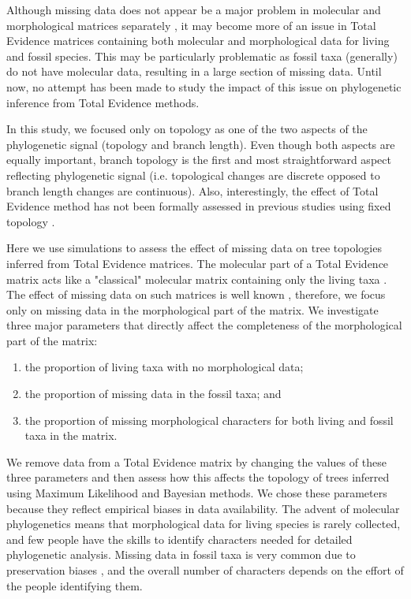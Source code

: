 \documentclass[12pt,letterpaper]{article}
\begin{document}
Although missing data does not appear be a major problem in molecular and morphological matrices separately \citep{wiensmissing2003,wiensmissing2006,wiensmissing2008,rouresite-specific2011}, it may become more of an issue in Total Evidence matrices containing both molecular and morphological data for living and fossil species. This may be particularly problematic as fossil taxa (generally) do not have molecular data, resulting in a large section of missing data. Until now, no attempt has been made to study the impact of this issue on phylogenetic inference from Total Evidence methods. 


In this study, we focused only on topology as one of the two aspects of the phylogenetic signal (topology and branch length). Even though both aspects are equally important, branch topology is the first and most straightforward aspect reflecting phylogenetic signal (i.e. topological changes are discrete opposed to branch length changes are continuous). Also, interestingly, the effect of Total Evidence method has not been formally assessed in previous studies using fixed topology \citep{ronquista2012,schragocombining2013}. %

Here we use simulations to assess the effect of missing data on tree topologies inferred from Total Evidence matrices. The molecular part of a Total Evidence matrix acts like a "classical" molecular matrix containing only the living taxa \citep{ronquista2012}. The effect of missing data on such matrices is well known \citep{wiensmissing2006,wiensmissing2008,rouresite-specific2011}, therefore, we focus only on missing data in the morphological part of the matrix. We investigate three major parameters that directly affect the completeness of the morphological part of the matrix:
\begin{enumerate}
\item the proportion of living taxa with no morphological data;
\item the proportion of missing data in the fossil taxa; and
\item the proportion of missing morphological characters for both living and fossil taxa in the matrix.
\end{enumerate} 
We remove data from a Total Evidence matrix by changing the values of these three parameters and then assess how this affects the topology of trees inferred using Maximum Likelihood and Bayesian methods. We chose these parameters because they reflect empirical biases in data availability. The advent of molecular phylogenetics means that morphological data for living species is rarely collected, and few people have the skills to identify characters needed for detailed phylogenetic analysis. Missing data in fossil taxa is very common due to preservation biases \citep{sansomfossilization2013}, and the overall number of characters depends on the effort of the people identifying them.
\end{document}
